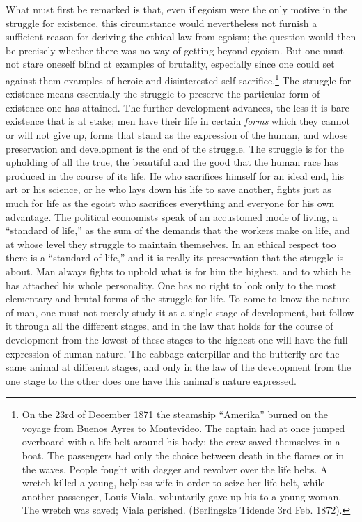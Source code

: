 \documentclass[12pt,a4paper,openany]{book}
\newcommand{\opage}[1]{\marginnote{\footnotesize\textit{[#1]}}}
\begin{document}
What must first be remarked is that, even if egoism were the only motive in
the struggle for existence, this circumstance would nevertheless not furnish a
sufficient reason for deriving the ethical law from egoism; the question would
then be precisely whether there was no way of getting beyond egoism. But one
must not stare oneself blind at examples of brutality, especially since one
could set against them examples of heroic and disinterested
self-sacrifice.\footnote[1]{On the 23rd of December 1871 the steamship
``Amerika'' burned on the voyage from Buenos Ayres to Montevideo. The captain
had at once jumped overboard with a life belt around his body; the crew saved
themselves in a boat. The passengers had only the choice between death in the
flames or in the waves. People fought with dagger and revolver over the life
belts. A wretch killed a young, helpless wife in order to seize her life belt,
while another passenger, Louis Viala, voluntarily gave up his to a young
woman. The wretch was saved; Viala perished. (Berlingske Tidende 3rd Feb.
1872).} The struggle for existence means essentially the struggle to preserve
the particular form of existence one has attained. The further development
advances, the less it is bare existence that is at stake; men have their life
in certain \emph{forms} which they cannot or will not give up, forms that
stand as the expression of the human, and whose preservation and development
is the end of the struggle. The struggle is for the upholding of \opage{32}all
the true, the beautiful and the good that the human race has produced in the
course of its life. He who sacrifices himself for an ideal end, his art or his
science, or he who lays down his life to save another, fights just as much for
life as the egoist who sacrifices everything and everyone for his own
advantage. The political economists speak of an accustomed mode of living, a
``standard of life,'' as the sum of the demands that the workers make on life,
and at whose level they struggle to maintain themselves. In an ethical respect
too there is a ``standard of life,'' and it is really its preservation that
the struggle is about. Man always fights to uphold what is for him the
highest, and to which he has attached his whole personality. One has no right
to look only to the most elementary and brutal forms of the struggle for life.
To come to know the nature of man, one must not merely study it at a single
stage of development, but follow it through all the different stages, and in
the law that holds for the course of development from the lowest of these
stages to the highest one will have the full expression of human nature. The
cabbage caterpillar and the butterfly are the same animal at different stages,
and only in the law of the development from the one stage to the other does
one have this animal's nature expressed.
\end{document}
